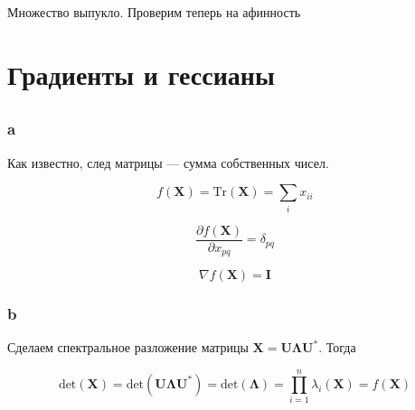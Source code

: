 	Множество выпукло. Проверим теперь на афинность
	
	\subsection{}
	
	\subsection{}
	
	\subsection{}
	
	\section{Градиенты и гессианы}
	
	\subsection{}
	
	\subsubsection{a}
	
	Как известно, след матрицы --- сумма собственных чисел.
	
	\begin{equation}
	f(\mathbf{X}) = \text{Tr} (\mathbf{X}) = \sum_i x_{ii}
	\end{equation}
	
	\begin{equation}
	\frac{\partial f(\mathbf{X}) }{\partial x_{pq}}  = \delta_{pq} 
	\end{equation}
	
	\begin{equation}
	\nabla f(\mathbf{X}) = \mathbf{I}
	\end{equation}
	
	\subsubsection{b}
	
	Сделаем спектральное разложение матрицы $\mathbf{X} = \mathbf{U} \mathbf{\Lambda} \mathbf{U^*}$. Тогда
	
	\begin{equation}
	\text{det} (\mathbf{X}) = \text{det}(\mathbf{U} \mathbf{\Lambda} \mathbf{U^*}) = \text{det}(\mathbf{\Lambda} ) = \prod\limits_{i=1}^n \lambda_i  (\mathbf{X}) = f(\mathbf{X})
	\end{equation}
	
